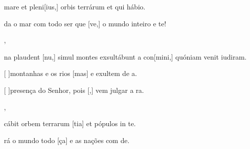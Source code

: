 {  {\item {} mare et pleni[ius,] orbis terrárum et qui hábio.~\Antiphona}%
    {\item {}da o mar com todo ser que [ve,] o mundo inteiro e te!~\Antiphona},
  {\item {}na plaudent [nu,] simul montes exsultábunt a con[mini,] quóniam venit iudiram.~\Antiphona}%
    {\item {}[ ]{mon}tanhas e os rios [mas] e exultem de a.~\Antiphona
      \item {}[ ]{pre}sença do Senhor, pois [,] vem julgar a ra.~\Antiphona},
  {\item {}cábit orbem terrarum [tia] et pópulos in \-te.~\Antiphona}%
    {\item {}rá o mundo todo [ça] e as nações com de.~\Antiphona}
}
